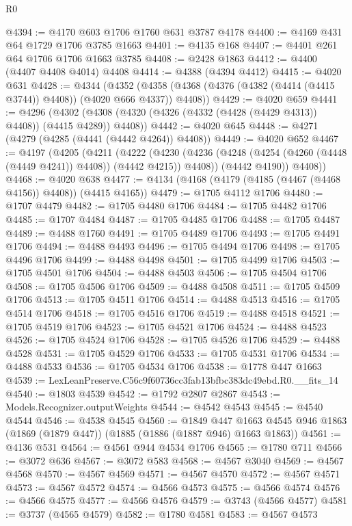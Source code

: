 \begin{lexlean}{R0}
\begin{coremodule}
@4394 := @4170 @603 @1706 @1760 @631 @3787 @4178
@4400 := @4169 @431 @64 @1729 @1706 @3785 @1663
@4401 := @4135 @168
@4407 := @4401 @261 @64 @1706 @1706 @1663 @3785
@4408 := @2428 @1863
@4412 := @4400 (@4407 @4408 @4014) @4408
@4414 := @4388 (@4394 @4412)
@4415 := @4020 @631
@4428 := @4344
    (@4352 (@4358 (@4368 (@4376 (@4382 (@4414 (@4415 @3744)) @4408)) (@4020 @666 @4337)) @4408))
@4429 := @4020 @659
@4441 := @4296
    (@4302 (@4308 (@4320 (@4326 (@4332 (@4428 (@4429 @4313)) @4408)) (@4415 @4289)) @4408))
@4442 := @4020 @645
@4448 := @4271 (@4279 (@4285 (@4441 (@4442 @4264)) @4408))
@4449 := @4020 @652
@4467 := @4197
    (@4205
      (@4211
        (@4222
          (@4230 (@4236 (@4248 (@4254 (@4260 (@4448 (@4449 @4241)) @4408)) (@4442 @4215)) @4408))
          (@4442 @4190))
        @4408))
@4468 := @4020 @638
@4477 := @4134 (@4168 (@4179 (@4185 (@4467 (@4468 @4156)) @4408)) (@4415 @4165))
@4479 := @1705 @4112 @1706
@4480 := @1707 @4479
@4482 := @1705 @4480 @1706
@4484 := @1705 @4482 @1706
@4485 := @1707 @4484
@4487 := @1705 @4485 @1706
@4488 := @1705 @4487
@4489 := @4488 @1760
@4491 := @1705 @4489 @1706
@4493 := @1705 @4491 @1706
@4494 := @4488 @4493
@4496 := @1705 @4494 @1706
@4498 := @1705 @4496 @1706
@4499 := @4488 @4498
@4501 := @1705 @4499 @1706
@4503 := @1705 @4501 @1706
@4504 := @4488 @4503
@4506 := @1705 @4504 @1706
@4508 := @1705 @4506 @1706
@4509 := @4488 @4508
@4511 := @1705 @4509 @1706
@4513 := @1705 @4511 @1706
@4514 := @4488 @4513
@4516 := @1705 @4514 @1706
@4518 := @1705 @4516 @1706
@4519 := @4488 @4518
@4521 := @1705 @4519 @1706
@4523 := @1705 @4521 @1706
@4524 := @4488 @4523
@4526 := @1705 @4524 @1706
@4528 := @1705 @4526 @1706
@4529 := @4488 @4528
@4531 := @1705 @4529 @1706
@4533 := @1705 @4531 @1706
@4534 := @4488 @4533
@4536 := @1705 @4534 @1706
@4538 := @1778 @447 @1663
@4539 := LexLeanPreserve.C56c9f60736cc3fab13bfbc383dc49ebd.R0.__fits_14
@4540 := @1803 @4539
@4542 := @1792 @2807 @2867
@4543 := Models.Recognizer.outputWeights
@4544 := @4542 @4543
@4545 := @4540 @4544
@4546 := @4538 @4545
@4560 := @1849
    @447
    @1663
    @4545
    @946
    @1863
    (@1869 (@1879 @447))
    (@1885 (@1886 (@1887 @946) @1663 @1863))
@4561 := @4136 @531
@4564 := @4561 @944 @4534 @1706
@4565 := @1780 @711
@4566 := @3072 @636
@4567 := @3072 @583
@4568 := @4567 @3040
@4569 := @4567 @4568
@4570 := @4567 @4569
@4571 := @4567 @4570
@4572 := @4567 @4571
@4573 := @4567 @4572
@4574 := @4566 @4573
@4575 := @4566 @4574
@4576 := @4566 @4575
@4577 := @4566 @4576
@4579 := @3743 (@4566 @4577)
@4581 := @3737 (@4565 @4579)
@4582 := @1780 @4581
@4583 := @4567 @4573

\end{coremodule}
\end{lexlean}
